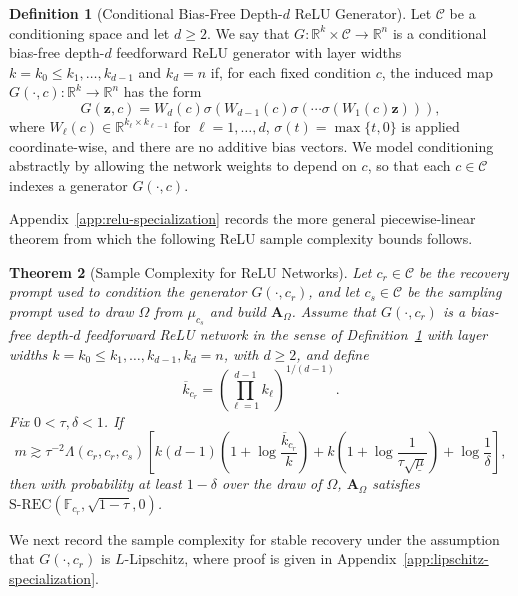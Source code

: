 \documentclass{article}
\theoremstyle{plain}
\newtheorem{theorem}{Theorem}[section]
\theoremstyle{definition}
\newtheorem{definition}[theorem]{Definition}
\theoremstyle{remark}
\begin{document}
\begin{definition}[Conditional Bias-Free Depth-$d$ ReLU Generator]
  \label{def:bias-free-relu}
  Let $\mathcal C$ be a conditioning space and let $d\geq 2$. We say that
  $G:\mathbb R^k\times\mathcal C\to\mathbb R^n$ is a conditional
  bias-free depth-$d$ feedforward ReLU generator with layer widths
   $k=k_0\leq k_1,\dots,k_{d-1}$ and $k_d=n$ if, for each fixed condition $c$, the induced map $G(\cdot, c):  \mathbb{R}^k \to \mathbb{R}^n$ has the form
  \[
    G(\mathbf z,c)
    =
    W_d(c)\sigma\!\left(
      W_{d-1}(c)\sigma\!\left(
        \cdots \sigma\!\left(W_1(c)\mathbf z\right)
      \right)
    \right),
  \]
  where $W_\ell(c)\in\mathbb R^{k_\ell\times k_{\ell-1}}$ for
  $\ell=1,\dots,d$, $\sigma(t)=\max\{t,0\}$ is applied coordinate-wise, and
  there are no additive bias vectors. We model conditioning abstractly by allowing the network weights to depend on $c$, so that each $c\in\mathcal C$ indexes a generator $G(\cdot,c)$.
\end{definition}

Appendix~\ref{app:relu-specialization} records the more general piecewise-linear theorem from which the following ReLU sample complexity bounds follows. 

\begin{theorem}[Sample Complexity for ReLU Networks]
  \label{thm:relu-srec}
  Let $c_r\in\mathcal C$ be the recovery prompt used to condition the generator $G(\cdot, c_r)$, and let $c_s\in\mathcal C$ be the sampling prompt used to draw $\Omega$ from $\mu_{c_s}$ and build $\mathbf A_\Omega$.
  Assume that $G\left(\cdot,c_r\right)$ is a bias-free depth-$d$ feedforward ReLU network in the sense of Definition~\ref{def:bias-free-relu} with layer widths
  $
    k = k_0 \leq k_1,\dots,k_{d-1},
    k_d = n
  $, with $d \geq 2$,
  and define
  \[
    \overline{k}_{c_r}
    =
    \left(
      \prod_{\ell=1}^{d-1} k_\ell
    \right)^{1/(d-1)}.
  \]
  Fix $0<\tau,\delta<1$. If
  \[
m \gtrsim \tau^{-2}\Lambda(c_r,c_r,c_s)\left[
  k(d-1)\left(1+\log\frac{\overline{k}_{c_r}}{k}\right)
  +
  k\left(1+\log\frac{1}{\tau\sqrt{\underline{\mu}}}\right)
  +
  \log\frac{1}{\delta}
\right],
\]
  then with probability at least $1-\delta$ over the draw of $\Omega$, $\mathbf A_\Omega$ satisfies
  $
  \mathrm{S\text{-}REC}
  \left(
    \mathbb{F}_{c_r},
    \sqrt{1-\tau},
    0
  \right)
  $.
\end{theorem}

We next record the sample complexity for stable recovery under the assumption that $G(\cdot, c_r)$ is $L$-Lipschitz, where proof is given in Appendix~\ref{app:lipschitz-specialization}.
\end{document}
